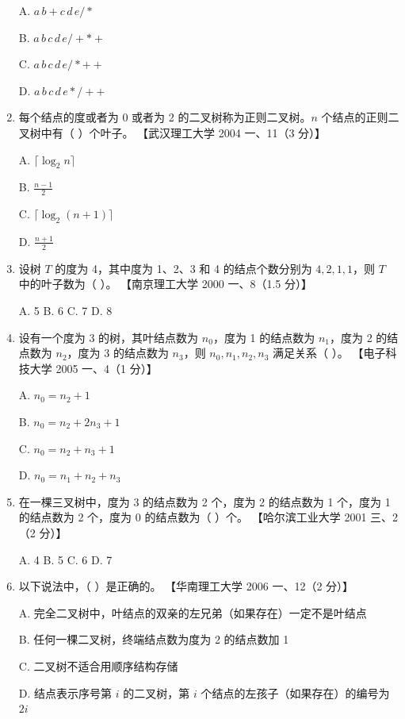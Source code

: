 \documentclass[lang=cn,newtx,10pt,scheme=chinese]{elegantbook}
\begin{document}
\begin{enumerate}
    A. $a \, b + c \, d \, e / *$  

    B. $a \, b \, c \, d \, e /+ \ast +$ 

    C. $a \, b \, c \, d \, e / \ast + +$  

    D. $a \, b \, c \, d \, e \ast / + +$  
    \item 每个结点的度或者为 0 或者为 2 的二叉树称为正则二叉树。$n$ 个结点的正则二叉树中有（ ）个叶子。  
    【武汉理工大学 2004 一、11（3 分）】

     A. $\lceil \log_2 n \rceil$  

    B. $\frac{n - 1}{2}$  

    C. $\lceil \log_2 (n + 1) \rceil$  

    D. $\frac{n + 1}{2}$  

    \item 设树 $T$ 的度为 4，其中度为 1、2、3 和 4 的结点个数分别为 $4, 2, 1, 1$，则 $T$ 中的叶子数为（ ）。  
    【南京理工大学 2000 一、8（1.5 分）】  

    A. 5 \quad B. 6 \quad C. 7 \quad D. 8  

    \item 设有一个度为 3 的树，其叶结点数为 $n_0$，度为 1 的结点数为 $n_1$，度为 2 的结点数为 $n_2$，度为 3 的结点数为 $n_3$，则 $n_0, n_1, n_2, n_3$ 满足关系（ ）。  
    【电子科技大学 2005 一、4（1 分）】  

    A. $n_0 = n_2  + 1$ 

    B. $n_0 = n_2 + 2n_3 + 1$  

    C. $n_0 = n_2 + n_3 + 1$  

    D. $n_0 = n_1 + n_2 + n_3$  

    \item 在一棵三叉树中，度为 3 的结点数为 2 个，度为 2 的结点数为 1 个，度为 1 的结点数为 2 个，度为 0 的结点数为（ ）个。  
    【哈尔滨工业大学 2001 三、2（2 分）】  

    A. 4 \quad B. 5 \quad C. 6 \quad D. 7  

    \item 以下说法中，（ ）是正确的。  
    【华南理工大学 2006 一、12（2 分）】  

    A. 完全二叉树中，叶结点的双亲的左兄弟（如果存在）一定不是叶结点  

    B. 任何一棵二叉树，终端结点数为度为 2 的结点数加 1 

    C. 二叉树不适合用顺序结构存储  

    D. 结点表示序号第 $i$ 的二叉树，第 $i$ 个结点的左孩子（如果存在）的编号为 $2i$  


\end{enumerate}
\end{document}
